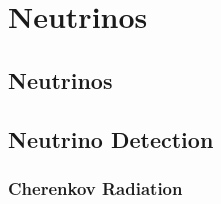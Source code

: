 \chapter{Neutrinos}
\label{sec:neutrinos}



\section{Neutrinos}
\label{sec:intro:multimessenger}



\section{Neutrino Detection}
\label{sec:intro:gammarays}



\subsection{Cherenkov Radiation}
\label{sec:intro:cosmicrays}
